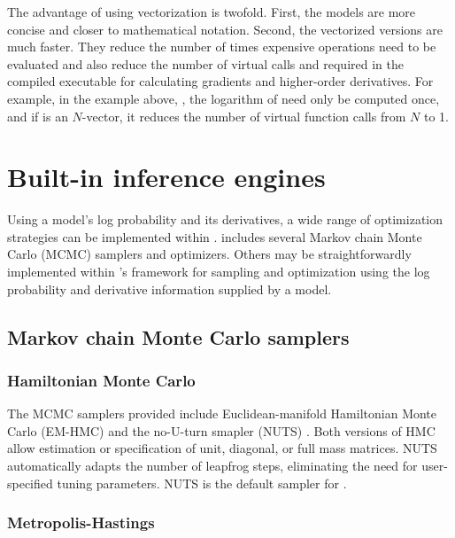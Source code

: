 \documentclass[article]{jss}
\begin{document}
The advantage of using vectorization is twofold.  First, the models
are more concise and closer to mathematical notation.  Second, the
vectorized versions are much faster.  They reduce the number of times
expensive operations need to be evaluated and also reduce the number
of virtual calls and required in the compiled 
executable for calculating gradients and higher-order derivatives.
For example, in the example above, , the logarithm of  need only be computed
once, and if  is an $N$-vector, it reduces the number of
virtual function calls from $N$ to 1.

\section{Built-in inference engines}

Using a model's log probability and its derivatives, a wide range of
optimization strategies can be implemented within .
 includes several Markov chain Monte Carlo (MCMC)
samplers and optimizers.  Others may be straightforwardly implemented
within 's  framework for sampling and
optimization using the log probability and derivative information
supplied by a model.

\subsection{Markov chain Monte Carlo samplers}

\subsubsection{Hamiltonian Monte Carlo}

The MCMC samplers provided include Euclidean-manifold Hamiltonian
Monte Carlo (EM-HMC) \citep{DuaneEtAl:1987, Neal:1994, Neal:2011} and the
no-U-turn smapler (NUTS) \citep{HoffmanGelman:2011}.  Both versions of
HMC allow estimation or specification of unit, diagonal, or full mass
matrices.  NUTS automatically adapts the number of leapfrog steps,
eliminating the need for user-specified tuning parameters.  NUTS is
the default sampler for .


\subsubsection{Metropolis-Hastings}
\end{document}
